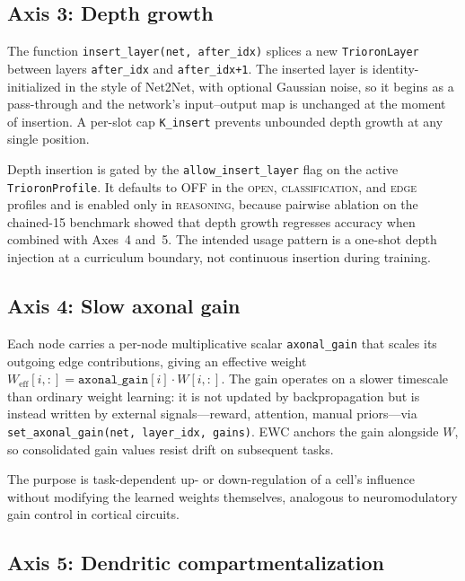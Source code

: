 \documentclass[11pt]{article}
\begin{document}
\subsection{Axis 3: Depth growth}
\label{sec:axis3}

The function \texttt{insert\_layer(net, after\_idx)} splices a new \texttt{TrioronLayer} between layers \texttt{after\_idx} and \texttt{after\_idx+1}.
The inserted layer is identity-initialized in the style of Net2Net, with optional Gaussian noise, so it begins as a pass-through and the network's input--output map is unchanged at the moment of insertion.
A per-slot cap \texttt{K\_insert} prevents unbounded depth growth at any single position.

Depth insertion is gated by the \texttt{allow\_insert\_layer} flag on the active \texttt{TrioronProfile}.
It defaults to OFF in the \textsc{open}, \textsc{classification}, and \textsc{edge} profiles and is enabled only in \textsc{reasoning}, because pairwise ablation on the chained-15 benchmark showed that depth growth regresses accuracy when combined with Axes~4 and~5.
The intended usage pattern is a one-shot depth injection at a curriculum boundary, not continuous insertion during training.

\subsection{Axis 4: Slow axonal gain}
\label{sec:axis4}

Each node carries a per-node multiplicative scalar \texttt{axonal\_gain} that scales its outgoing edge contributions, giving an effective weight $W_{\mathrm{eff}}[i,:] = \texttt{axonal\_gain}[i] \cdot W[i,:]$.
The gain operates on a slower timescale than ordinary weight learning: it is not updated by backpropagation but is instead written by external signals---reward, attention, manual priors---via \texttt{set\_axonal\_gain(net, layer\_idx, gains)}.
EWC anchors the gain alongside $W$, so consolidated gain values resist drift on subsequent tasks.

The purpose is task-dependent up- or down-regulation of a cell's influence without modifying the learned weights themselves, analogous to neuromodulatory gain control in cortical circuits.

\subsection{Axis 5: Dendritic compartmentalization}
\label{sec:axis5}
\end{document}
